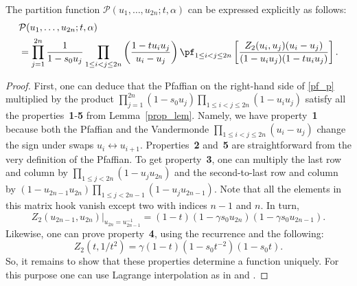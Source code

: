 \begin{theorem} \label{pf_thm}
	The partition function $\mathcal{P} (u_1, \dots, u_{2n}; t, \alpha)$ can be expressed explicitly as follows:
	\begin{equation}
	\begin{split}
	&
	\label{pf_p}
	\mathcal{P} (u_1, \dots, u_{2n}; t, \alpha) \\&
	= 	\prod_{j = 1}^{2n} \frac{1}{1 - s_0 u_j} \prod_{1 \leq i<j \leq 2n}
	\left(
	\frac{1-t u_i u_j}{u_i - u_j}
	\right)
	\pf_{1\leq i < j \leq 2n}
	\left[
	\frac{Z_{2}(u_i, u_j) (u_i - u_j)}
	{(1-u_i u_j) (1-t u_i u_j)}
	\right].
	\end{split}
	\end{equation}
\end{theorem}
\begin{proof}
	First, one can deduce that the Pfaffian on the right-hand side of \eqref{pf_p} multiplied by the product $\prod_{j = 1}^{2n} (1 - s_0 u_j) \prod_{1 \leq i < j \leq 2n} (1 - u_{i} u_{j}) $ satisfy all the properties~\textbf{1}-\textbf{5} from Lemma~\ref{prop_lem}. Namely, we have property~\textbf{1} because both the Pfaffian and the Vandermonde $\prod_{1 \leq i < j \leq 2n} (u_{i} - u_{j}) $ change the sign under swaps $u_i \leftrightarrow u_{i+1}$. Properties~\textbf{2} and~\textbf{5} are straightforward from the very definition of the Pfaffian. To get property~\textbf{3}, one can multiply the last row and column by $\prod_{1 \leq j < 2n} (1 - u_{j} u_{2n}) $ and the second-to-last row and column by $(1 - u_{2n-1} u_{2n})\prod_{1 \leq j < 2n-1} (1 - u_{j} u_{2n-1}) $. Note that all the elements in this matrix hook vanish except two with indices $n-1$ and $n$. In turn,
	\begin{equation*}
	Z_{2}(u_{2n-1},u_{2n})\big\vert_{u_{2n}=u_{2n-1}^{-1}}= (1-t)
	(1-\gamma s_0u_{2n})(1-\gamma s_0 u_{2n-1}).
	\end{equation*}
	Likewise, one can prove property~\textbf{4}, using the recurrence and the following: \begin{equation*}Z_{2}(t,  1 / t^2) = \gamma(1 - t)(1 - s_{0} t^{-2})(1 -s_{0} t).\end{equation*}
	So, it remains to show that these properties determine a function uniquely. For this purpose one can use Lagrange interpolation as in  \cite{Pet21} and \cite[Appendix B]{WZJ16}.
	

\end{proof}
